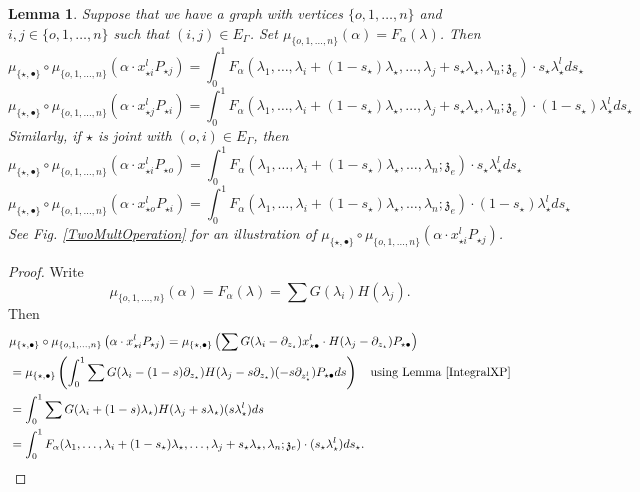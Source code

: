 \documentclass[11pt]{amsart}
\newtheorem{lem}[thm]{Lemma}
\theoremstyle{definition}
\theoremstyle{remark}
\numberwithin{equation}{section}
\begin{document}
\begin{lem}\label{IntegralS}
  Suppose that we have a graph with vertices $\{o,1,\dots,n\}$ and $i,j\in \{o,1,\dots,n\}$ such that $(i,j)\in
  E_{\Gamma}$. Set $\mu_{\{o,1,\dots, n\}}\left(\alpha\right)=F_{\alpha}(\lambda)$. Then
  $$
  \mu_{\{\star,\bullet\}}\circ \mu_{\{o,1,\dots, n\}}\left(\alpha\cdot x^l_{\star i}P_{\star j }\right)=\int^1_0 F_{\alpha}(\lambda_1,\dots,\lambda_i+(1-s_{\star})\lambda_{\star},\dots,\lambda_j+s_{\star}\lambda_{\star},\lambda_{n};\mathfrak{z}_e)\cdot s_{\star}\lambda^l_{\star}ds_{\star}
  $$
    $$
  \mu_{\{\star,\bullet\}}\circ \mu_{\{o,1,\dots, n\}}\left(\alpha\cdot x^l_{\star j}P_{\star i }\right)=\int^1_0 F_{\alpha}(\lambda_1,\dots,\lambda_i+(1-s_{\star})\lambda_{\star},\dots,\lambda_j+s_{\star}\lambda_{\star},\lambda_{n};\mathfrak{z}_e)\cdot(1-s_{\star})\lambda^l_{\star}ds_{\star}
  $$
  Similarly, if $\star$ is joint with $(o,i)\in E_{\Gamma}$, then
  $$
  \mu_{\{\star,\bullet\}}\circ \mu_{\{o,1,\dots, n\}}\left(\alpha\cdot x^l_{\star i}P_{\star o }\right)=\int^1_0 F_{\alpha}(\lambda_1,\dots,\lambda_i+(1-s_{\star})\lambda_{\star},\dots,\lambda_{n};\mathfrak{z}_e)\cdot s_{\star}\lambda^l_{\star}ds_{\star}
  $$
   $$
  \mu_{\{\star,\bullet\}}\circ \mu_{\{o,1,\dots, n\}}\left(\alpha\cdot x^l_{\star o}P_{\star i}\right)=\int^1_0 F_{\alpha}(\lambda_1,\dots,\lambda_i+(1-s_{\star})\lambda_{\star},\dots,\lambda_{n};\mathfrak{z}_e)\cdot(1-s_{\star})\lambda^l_{\star}ds_{\star}
  $$
  See Fig. \ref{TwoMultOperation} for an illustration of $\mu_{\{\star,\bullet\}}\circ \mu_{\{o,1,\dots, n\}}\left(\alpha\cdot x^l_{\star i}P_{\star j }\right)$.
\end{lem}
\begin{proof}
  Write
  $$
\mu_{\{o,1,\dots, n\}}\left(\alpha\right)=F_{\alpha}(\lambda)=\sum G(\lambda_i)H(\lambda_j).
  $$
  Then
  \begin{align*}
   &  \mu_{\{\star,\bullet\}}\circ \mu_{\{o,1,\dots, n\}}\left(\alpha\cdot x^l_{\star i}P_{\star j }\right)=  \mu_{\{\star,\bullet\}}\left(\sum G(\lambda_i-\partial_{z_{\star}})x^l_{\star\bullet}\cdot H(\lambda_j-\partial_{z_{\star}})P_{\star\bullet}\right)\\
     &=\mu_{\{\star,\bullet\}}\left(\int^1_0\sum G(\lambda_i-(1-s)\partial_{z_{\star}}) H(\lambda_j-s\partial_{z_{\star}})(-s\partial_{z^l_{\star}})P_{\star\bullet}ds\right)\quad \text{using Lemma \ref{IntegralXP}}\\
     &=\int^1_0\sum G(\lambda_i+(1-s)\lambda_{\star}) H(\lambda_j+s\lambda_{\star})(s\lambda^l_{\star})ds\\
     &=\int^1_0 F_{\alpha}(\lambda_1,\dots,\lambda_i+(1-s_{\star})\lambda_{\star},\dots,\lambda_j+s_{\star}\lambda_{\star},\lambda_{n};\mathfrak{z}_e)\cdot(s_{\star}\lambda^l_{\star})ds_{\star}.
  \end{align*}
\end{proof}
\end{document}
